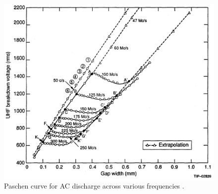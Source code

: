 \begin{figure}[h!]
	\centering
	\includegraphics[width=\linewidth]{chapter_2/figures/ac_breakdown.png}
	\caption{Paschen curve for AC discharge across various frequencies \cite{Pim1949}.}
	\label{fig:ac_breakdown}
\end{figure} 


